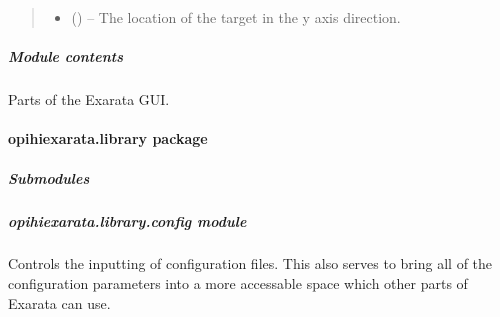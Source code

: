 \documentclass[letterpaper,11pt,english]{sphinxmanual}
\begin{document}
\begin{savenotes}
\begin{fulllineitems}
\begin{quote}
\begin{description}
\begin{itemize}
\item {} 
\sphinxAtStartPar
{} () – The location of the target in the y axis direction.

\end{itemize}


\end{description}\end{quote}

\end{fulllineitems}\end{savenotes}


\begin{savenotes}\begin{fulllineitems}
\label{\detokenize{code/opihiexarata.gui.selector:opihiexarata.gui.selector.main}}
\pysigstartsignatures
{}
\pysigstopsignatures
\end{fulllineitems}\end{savenotes}



\subparagraph{Module contents}
\label{\detokenize{code/opihiexarata.gui:module-opihiexarata.gui}}\label{\detokenize{code/opihiexarata.gui:module-contents}}
\sphinxAtStartPar
Parts of the Exarata GUI.

\sphinxstepscope


\paragraph{opihiexarata.library package}
\label{\detokenize{code/opihiexarata.library:opihiexarata-library-package}}\label{\detokenize{code/opihiexarata.library::doc}}

\subparagraph{Submodules}
\label{\detokenize{code/opihiexarata.library:submodules}}
\sphinxstepscope


\subparagraph{opihiexarata.library.config module}
\label{\detokenize{code/opihiexarata.library.config:module-opihiexarata.library.config}}\label{\detokenize{code/opihiexarata.library.config:opihiexarata-library-config-module}}\label{\detokenize{code/opihiexarata.library.config::doc}}
\sphinxAtStartPar
Controls the inputting of configuration files. This also serves to bring all
of the configuration parameters into a more accessable space which other parts
of Exarata can use.
\end{document}
